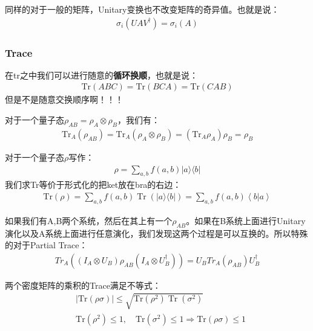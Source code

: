 \bigskip
{}

同样的对于一般的矩阵，Unitary变换也不改变矩阵的奇异值。也就是说：
\begin{align}
  \sigma_i(UA V^\dagger)=\sigma_i(A)
\end{align}

\subsubsection{Trace}


在tr之中我们可以进行随意的\textbf{循环换顺}，也就是说：
\begin{align}
  \mathrm{Tr}(ABC)=\mathrm{Tr}(BCA)=\mathrm{Tr}(CAB)
\end{align}
但是不是随意交换顺序啊！！！

\bigskip
{}

对于一个量子态$ \rho_{AB} = \rho_A \otimes \rho_B $，我们有：
\begin{align}
  \mathrm{Tr}_A(\rho_{AB}) = \mathrm{Tr}_A(\rho_A \otimes \rho_B) =
  (\mathrm{Tr}_A \rho_A) \rho_B = \rho_B
\end{align}

\bigskip
{}

对于一个量子态$ \rho $写作：
\begin{align}
  \rho=\sum_{a,b}f(a,b)|a\rangle\langle b|
\end{align}
我们求Tr等价于形式化的把ket放在bra的右边：
\begin{align}
  \mathrm{Tr}(\rho)=\sum_{a,b}f(a,b)\operatorname{Tr}(|a\rangle\langle
  b|)=\sum_{a,b}f(a,b)\left\langle b|a\right\rangle
\end{align}

\bigskip
{}

如果我们有A,B两个系统，然后在其上有一个$ \rho_{AB}
$。如果在B系统上面进行Unitary演化以及A系统上面进行任意演化，我们发现这两个过程是可以互换的。所以特殊的对于Partial Trace：
\begin{align}
  Tr_A ((I_A \otimes U_B) \rho_{AB} (I_A \otimes U_B^\dagger)) = U_B
  Tr_A(\rho_{AB}) U_B^\dagger
\end{align}

\bigskip
{}

\bigskip
{}

两个密度矩阵的乘积的Trace满足不等式：
\begin{align}
  &
  |\mathrm{Tr}(\rho\sigma)|\leq\sqrt{\mathrm{Tr}(\rho^2)\operatorname{Tr}(\sigma^2)}
  \\
  &\mathrm{Tr}(\rho^2)\leq1,\quad\mathrm{Tr}(\sigma^2)\leq1
  \Rightarrow \mathrm{Tr}(\rho\sigma)\leq1
\end{align}

